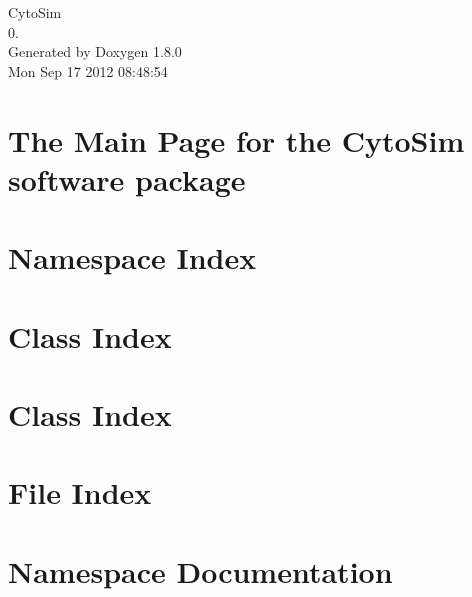 \documentclass{book}
\begin{document}
\hypersetup{pageanchor=false,citecolor=blue}
\begin{titlepage}
\vspace*{7cm}
\begin{center}
{\Large Cyto\-Sim \\[1ex]\large 0. }\\
\vspace*{1cm}
{\large Generated by Doxygen 1.8.0}\\
\vspace*{0.5cm}
{\small Mon Sep 17 2012 08:48:54}\\
\end{center}
\end{titlepage}
\clearemptydoublepage
{}
\tableofcontents
\clearemptydoublepage
{}
\hypersetup{pageanchor=true,citecolor=blue}
\chapter{The Main Page for the Cyto\-Sim software package}
\label{index}\hypertarget{index}{}
\chapter{Namespace Index}

\chapter{Class Index}

\chapter{Class Index}

\chapter{File Index}

\chapter{Namespace Documentation}

\end{document}
